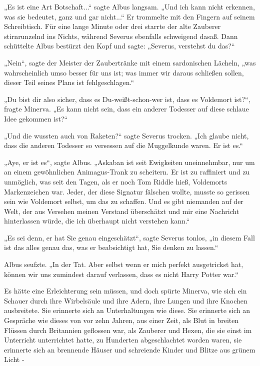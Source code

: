{„Es ist eine Art Botschaft...“ sagte Albus langsam. „Und ich kann nicht erkennen, was sie bedeutet, ganz und gar nicht...“ Er trommelte mit den Fingern auf seinem Schreibtisch. Für eine lange Minute oder drei starrte der alte Zauberer stirnrunzelnd ins Nichts, während Severus ebenfalls schweigend dasaß. Dann schüttelte Albus bestürzt den Kopf und sagte: „Severus, verstehst du das?“

„Nein“, sagte der Meister der Zaubertränke mit einem sardonischen Lächeln, „was wahrscheinlich umso besser für uns ist; was immer wir daraus schließen sollen, dieser Teil seines Plans ist fehlgeschlagen.“

„Du bist dir also sicher, dass es Du-weißt-schon-wer ist, dass es Voldemort ist?“, fragte Minerva. „Es kann nicht sein, dass ein anderer Todesser auf diese schlaue Idee gekommen ist?“

„Und die wussten auch von Raketen?“ sagte Severus trocken. „Ich glaube nicht, dass die anderen Todesser so versessen auf die Muggelkunde waren. Er ist es.“

„Aye, er ist es“, sagte Albus. „Askaban ist seit Ewigkeiten uneinnehmbar, nur um an einem gewöhnlichen Animagus-Trank zu scheitern. Er ist zu raffiniert und zu unmöglich, was seit den Tagen, als er noch Tom Riddle hieß, Voldemorts Markenzeichen war. Jeder, der diese Signatur fälschen wollte, musste so gerissen sein wie Voldemort selbst, um das zu schaffen. Und es gibt niemanden auf der Welt, der aus Versehen meinen Verstand überschätzt und mir eine Nachricht hinterlassen würde, die ich überhaupt nicht verstehen kann.“

„Es sei denn, er hat Sie genau eingeschätzt“, sagte Severus tonlos, „in diesem Fall ist das alles genau das, was er beabsichtigt hat, Sie denken zu lassen.“

Albus seufzte. „In der Tat. Aber selbst wenn er mich perfekt ausgetrickst hat, können wir uns zumindest darauf verlassen, dass es nicht Harry Potter war.“

Es hätte eine Erleichterung sein müssen, und doch spürte Minerva, wie sich ein Schauer durch ihre Wirbelsäule und ihre Adern, ihre Lungen und ihre Knochen ausbreitete. Sie erinnerte sich an Unterhaltungen wie diese. Sie erinnerte sich an Gespräche wie dieses von vor zehn Jahren, aus einer Zeit, als Blut in breiten Flüssen durch Britannien geflossen war, als Zauberer und Hexen, die sie einst im Unterricht unterrichtet hatte, zu Hunderten abgeschlachtet worden waren, sie erinnerte sich an brennende Häuser und schreiende Kinder und Blitze aus grünem Licht -

}
